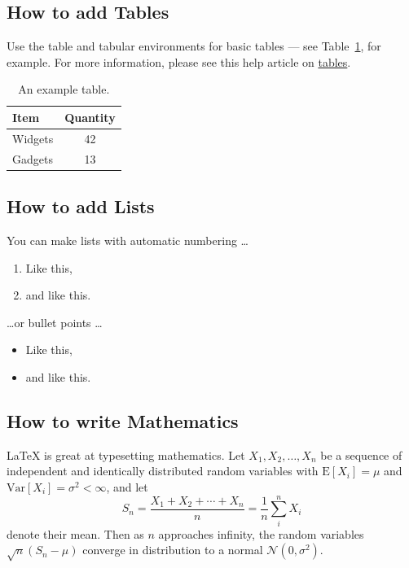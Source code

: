 \documentclass{article}
\begin{document}
\subsection{How to add Tables}

Use the table and tabular environments for basic tables {---} see Table~\ref{tab:widgets}, for example. For more information, please see this help article on \href{https://www.overleaf.com/learn/latex/tables}{tables}.

\begin{table}
  \centering
  \begin{tabular}{l c}
    \toprule
    Item    & Quantity \\
    \midrule
    Widgets & 42       \\
    Gadgets & 13       \\
    \bottomrule
  \end{tabular}
  \caption{\label{tab:widgets}An example table.}
\end{table}

\subsection{How to add Lists}

You can make lists with automatic numbering \dots

\begin{enumerate}
  \item Like this,
  \item and like this.
\end{enumerate}
\dots or bullet points \dots
\begin{itemize}
  \item Like this,
  \item and like this.
\end{itemize}

\subsection{How to write Mathematics}

\LaTeX{} is great at typesetting mathematics. Let \(X_1, X_2, \ldots, X_n\) be a sequence of independent and identically distributed random variables with \(\text{E}[X_i] = \mu \) and \(\text{Var}[X_i] = \sigma^2 < \infty \), and let
\[S_n = \frac{X_1 + X_2 + \cdots + X_n}{n}
  = \frac{1}{n}\sum_{i}^{n} X_i\]
denote their mean. Then as \(n\) approaches infinity, the random variables \(\sqrt{n}(S_n - \mu)\) converge in distribution to a normal \(\mathcal{N}(0, \sigma^2)\).
\end{document}
